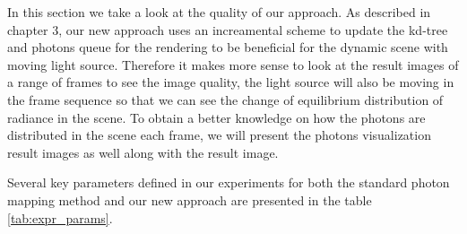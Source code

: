 In this section we take a look at the quality of our approach. As described in chapter 3, our new approach uses an increamental scheme to update the kd-tree and photons queue for the rendering to be beneficial for the dynamic scene with moving light source. Therefore it makes more sense to look at the result images of a range of frames to see the image quality, the light source will also be moving in the frame sequence so that we can see the change of equilibrium distribution of radiance in the scene. To obtain a better knowledge on how the photons are distributed in the scene each frame, we will present the photons visualization result images as well along with the result image. 

Several key parameters defined in our experiments for both the standard photon mapping method and our new approach are presented in the table \ref{tab:expr_params}. 

